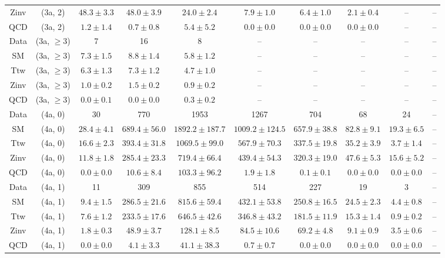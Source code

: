 \begin{table}[h!]
{\begin{tabular}{cccccccccc}
	Zinv & (3a, 2) & $48.3\pm 3.3$ & $48.0\pm 3.9$ & $24.0\pm 2.4$ & $7.9\pm 1.0$ & $6.4\pm 1.0$ & $2.1\pm 0.4$ & -- & -- \\[0.5ex] 
	QCD & (3a, 2) & $1.2\pm 1.4$ & $0.7\pm 0.8$ & $5.4\pm 5.2$ & $0.0\pm 0.0$ & $0.0\pm 0.0$ & $0.0\pm 0.0$ & -- & -- \\[0.5ex] 
	Data & (3a, $\ge3$) & 7 & 16 & 8 & -- & -- & -- & -- & -- \\[0.5ex] 
	SM & (3a, $\ge3$) & $7.3\pm 1.5$ & $8.8\pm 1.4$ & $5.8\pm 1.2$ & -- & -- & -- & -- & -- \\[0.5ex] 
	Ttw & (3a, $\ge3$) & $6.3\pm 1.3$ & $7.3\pm 1.2$ & $4.7\pm 1.0$ & -- & -- & -- & -- & -- \\[0.5ex] 
	Zinv & (3a, $\ge3$) & $1.0\pm 0.2$ & $1.5\pm 0.2$ & $0.9\pm 0.2$ & -- & -- & -- & -- & -- \\[0.5ex] 
	QCD & (3a, $\ge3$) & $0.0\pm 0.1$ & $0.0\pm 0.0$ & $0.3\pm 0.2$ & -- & -- & -- & -- & -- \\[0.5ex] 
	Data & (4a, 0) & 30 & 770 & 1953 & 1267 & 704 & 68 & 24 & -- \\[0.5ex] 
	SM & (4a, 0) & $28.4\pm 4.1$ & $689.4\pm 56.0$ & $1892.2\pm 187.7$ & $1009.2\pm 124.5$ & $657.9\pm 38.8$ & $82.8\pm 9.1$ & $19.3\pm 6.5$ & -- \\[0.5ex] 
	Ttw & (4a, 0) & $16.6\pm 2.3$ & $393.4\pm 31.8$ & $1069.5\pm 99.0$ & $567.9\pm 70.3$ & $337.5\pm 19.8$ & $35.2\pm 3.9$ & $3.7\pm 1.4$ & -- \\[0.5ex] 
	Zinv & (4a, 0) & $11.8\pm 1.8$ & $285.4\pm 23.3$ & $719.4\pm 66.4$ & $439.4\pm 54.3$ & $320.3\pm 19.0$ & $47.6\pm 5.3$ & $15.6\pm 5.2$ & -- \\[0.5ex] 
	QCD & (4a, 0) & $0.0\pm 0.0$ & $10.6\pm 8.4$ & $103.3\pm 96.2$ & $1.9\pm 1.8$ & $0.1\pm 0.1$ & $0.0\pm 0.0$ & $0.0\pm 0.0$ & -- \\[0.5ex] 
	Data & (4a, 1) & 11 & 309 & 855 & 514 & 227 & 19 & 3 & -- \\[0.5ex] 
	SM & (4a, 1) & $9.4\pm 1.5$ & $286.5\pm 21.6$ & $815.6\pm 59.4$ & $432.1\pm 53.8$ & $250.8\pm 16.5$ & $24.5\pm 2.3$ & $4.4\pm 0.8$ & -- \\[0.5ex] 
	Ttw & (4a, 1) & $7.6\pm 1.2$ & $233.5\pm 17.6$ & $646.5\pm 42.6$ & $346.8\pm 43.2$ & $181.5\pm 11.9$ & $15.3\pm 1.4$ & $0.9\pm 0.2$ & -- \\[0.5ex] 
	Zinv & (4a, 1) & $1.8\pm 0.3$ & $48.9\pm 3.7$ & $128.1\pm 8.5$ & $84.5\pm 10.6$ & $69.2\pm 4.8$ & $9.1\pm 0.9$ & $3.5\pm 0.6$ & -- \\[0.5ex] 
	QCD & (4a, 1) & $0.0\pm 0.0$ & $4.1\pm 3.3$ & $41.1\pm 38.3$ & $0.7\pm 0.7$ & $0.0\pm 0.0$ & $0.0\pm 0.0$ & $0.0\pm 0.0$ & -- \\[0.5ex] 

\end{tabular}}
\end{table}
